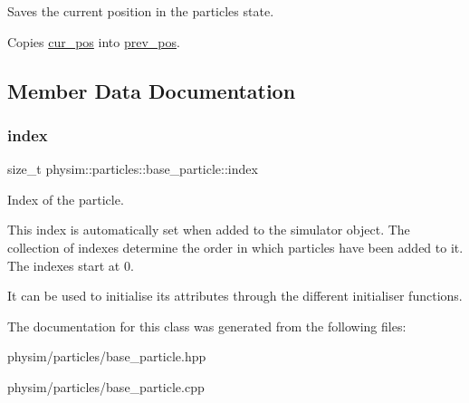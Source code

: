 Saves the current position in the particle\textquotesingle{}s state. 

Copies \hyperlink{classphysim_1_1particles_1_1base__particle_a6298a121dea043741e5d3722386163c6}{cur\+\_\+pos} into \hyperlink{classphysim_1_1particles_1_1base__particle_a08072db6a1a59d21acc9cac6ac8965f7}{prev\+\_\+pos}. 

\subsection{Member Data Documentation}
\mbox{\label{classphysim_1_1particles_1_1base__particle_a44f5de3bb4b860dfd511e28e1d6519d5}} 
\subsubsection{\texorpdfstring{index}{index}}
{\footnotesize\ttfamily size\+\_\+t physim\+::particles\+::base\+\_\+particle\+::index}



Index of the particle. 

This index is automatically set when added to the simulator object. The collection of indexes determine the order in which particles have been added to it. The indexes start at 0.

It can be used to initialise its attributes through the different initialiser functions. 

The documentation for this class was generated from the following files\+:\begin{DoxyCompactItemize}
\item 
physim/particles/base\+\_\+particle.\+hpp\item 
physim/particles/base\+\_\+particle.\+cpp\end{DoxyCompactItemize}
